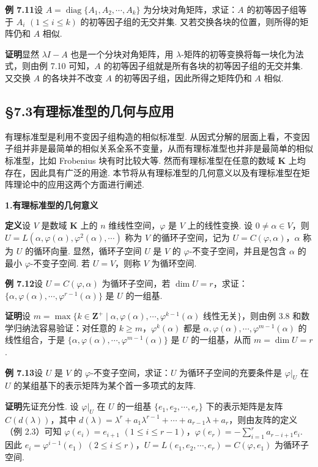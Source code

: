 \documentclass[UTF8, 12pt, fontset=fandol, oneside]{ctexart}
\begin{document}
\noindent\textbf{例 7.11}\quad 设 $A=\operatorname{diag}\{A_1,A_2,\cdots,A_k\}$ 为分块对角矩阵，求证：$A$ 的初等因子组等于 $A_i$ $(1\le i\le k)$ 的初等因子组的无交并集. 又若交换各块的位置，则所得的矩阵仍和 $A$ 相似.

\noindent\textbf{证明}\quad 显然 $\lambda I-A$ 也是一个分块对角矩阵，用 $\lambda$-矩阵的初等变换将每一块化为法式，则由例 7.10 可知，$A$ 的初等因子组就是所有各块的初等因子组的无交并集. 又交换 $A$ 的各块并不改变 $A$ 的初等因子组，因此所得之矩阵仍和 $A$ 相似.

\subsection*{§7.3\quad 有理标准型的几何与应用}

有理标准型是利用不变因子组构造的相似标准型. 从因式分解的层面上看，不变因子组并非是最简单的相似关系全系不变量，从而有理标准型也并非是最简单的相似标准型，比如 Frobenius 块有时比较大等. 然而有理标准型在任意的数域 $\mathbf{K}$ 上均存在，因此具有广泛的用途. 本节将从有理标准型的几何意义以及有理标准型在矩阵理论中的应用这两个方面进行阐述.

\noindent\textbf{1.\quad 有理标准型的几何意义}

\noindent\textbf{定义}\quad 设 $V$ 是数域 $\mathbf{K}$ 上的 $n$ 维线性空间，$\varphi$ 是 $V$ 上的线性变换. 设 $0\ne\alpha\in V$，则 $U=L(\alpha,\varphi(\alpha),\varphi^2(\alpha),\cdots)$ 称为 $V$ 的循环子空间，记为 $U=C(\varphi,\alpha)$，$\alpha$ 称为 $U$ 的循环向量. 显然，循环子空间 $U$ 是 $V$ 的 $\varphi$-不变子空间，并且是包含 $\alpha$ 的最小 $\varphi$-不变子空间. 若 $U=V$，则称 $V$ 为循环空间.

\noindent\textbf{例 7.12}\quad 设 $U=C(\varphi,\alpha)$ 为循环子空间，若 $\dim U=r$，求证：$\{\alpha,\varphi(\alpha),\cdots,\varphi^{r-1}(\alpha)\}$ 是 $U$ 的一组基.

\noindent\textbf{证明}\quad 设 $m=\max\{k\in\mathbf{Z}^+\mid \alpha,\varphi(\alpha),\cdots,\varphi^{k-1}(\alpha)\text{ 线性无关}\}$，则由例 3.8 和数学归纳法容易验证：对任意的 $k\ge m$，$\varphi^k(\alpha)$ 都是 $\alpha,\varphi(\alpha),\cdots,\varphi^{m-1}(\alpha)$ 的线性组合，于是 $\{\alpha,\varphi(\alpha),\cdots,\varphi^{m-1}(\alpha)\}$ 是 $U$ 的一组基，从而 $m=\dim U=r$.

\noindent\textbf{例 7.13}\quad 设 $U$ 是 $V$ 的 $\varphi$-不变子空间，求证：$U$ 为循环子空间的充要条件是 $\varphi|_U$ 在 $U$ 的某组基下的表示矩阵为某个首一多项式的友阵.

\noindent\textbf{证明}\quad 先证充分性. 设 $\varphi|_U$ 在 $U$ 的一组基 $\{e_1,e_2,\cdots,e_r\}$ 下的表示矩阵是友阵 $C(d(\lambda))$，其中 $d(\lambda)=\lambda^r+a_1\lambda^{r-1}+\cdots+a_{r-1}\lambda+a_r$，则由友阵的定义（例 2.3）可知 $\varphi(e_i)=e_{i+1}$ $(1\le i\le r-1)$，$\varphi(e_r)=-\sum\limits_{i=1}^r a_{r-i+1}e_i$. 因此 $e_i=\varphi^{i-1}(e_1)$ $(2\le i\le r)$，$U=L(e_1,e_2,\cdots,e_r)=C(\varphi,e_1)$ 为循环子空间.
\end{document}
